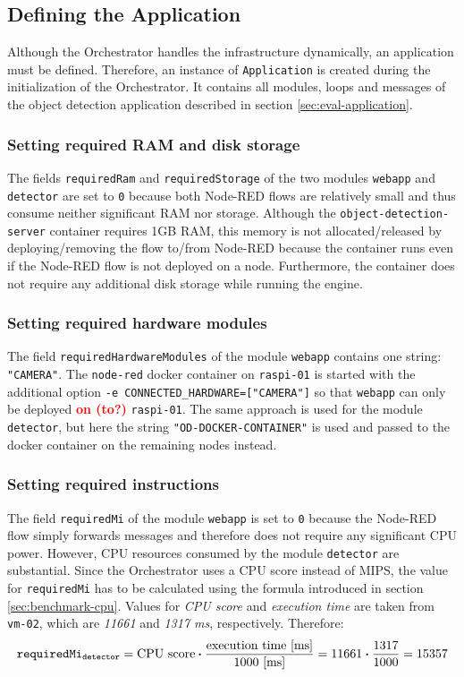 \subsection*{Defining the Application}

Although the Orchestrator handles the infrastructure dynamically, an application must be defined. Therefore, an instance of \texttt{Application} is created during the initialization of the Orchestrator.
It contains all modules, loops and messages of the object detection application described in section \ref{sec:eval-application}.

\subsubsection*{Setting required RAM and disk storage}
The fields \texttt{requiredRam} and \texttt{requiredStorage} of the two modules \texttt{webapp} and \texttt{detector} are set to \texttt{0} because both Node-RED flows are relatively small and thus consume neither significant RAM nor storage.
Although the \texttt{object-detection-server} container requires 1GB RAM, this memory is not allocated/released by deploying/removing the flow to/from Node-RED because the container runs even if the Node-RED flow is not deployed on a node.
Furthermore, the container does not require any additional disk storage while running the engine.

\subsubsection*{Setting required hardware modules}
The field \texttt{requiredHardwareModules} of the module \texttt{webapp} contains one string: \texttt{"CAMERA"}.
The \texttt{node-red} docker container on \texttt{raspi-01} is started with the additional option \texttt{-e CONNECTED\_HARDWARE=["CAMERA"]} so that \texttt{webapp} can only be deployed \textcolor{red}{\textbf{on (to?)}} \texttt{raspi-01}. The same approach is used for the module \texttt{detector}, but here the string \texttt{"OD-DOCKER-CONTAINER"} is used and passed to the docker container on the remaining nodes instead.

\subsubsection*{Setting required instructions}
The field \texttt{requiredMi} of the module \texttt{webapp} is set to \texttt{0} because the Node-RED flow simply forwards messages and therefore does not require any significant CPU power.
However, CPU resources consumed by the module \texttt{detector} are substantial.
Since the Orchestrator uses a CPU score instead of MIPS, the value for \texttt{requiredMi} has to be calculated using the formula introduced in section \ref{sec:benchmark-cpu}.
Values for \textit{CPU score} and \textit{execution time} are taken from \texttt{vm-02}, which are \textit{11661} and \textit{1317 ms}, respectively.
Therefore:
\[\textrm{\texttt{requiredMi\textsubscript{detector}}} = \textrm{CPU score} \boldsymbol{\cdot} \frac{\textrm{execution time [ms]}}{1000 \textrm{ [ms]}} = 11661 \boldsymbol{\cdot} \frac{1317}{1000} = 15357\]

